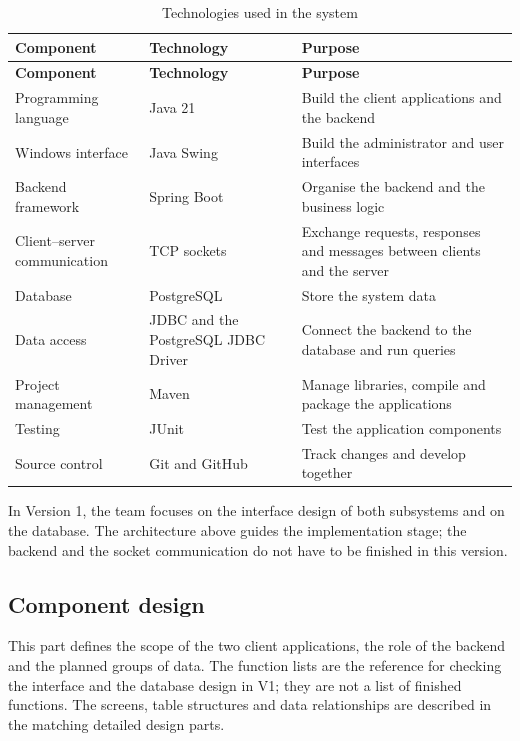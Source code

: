 \begingroup
\small
\begin{longtable}{|L{3.1cm}|L{3.9cm}|L{\dimexpr\textwidth-7cm-6\arrayrulewidth\relax}|}
  \caption{Technologies used in the system}
  \label{tab:technologies}\\
  \hline
  \textbf{Component} & \textbf{Technology} & \textbf{Purpose}\\
  \hline
  \endfirsthead
  \hline
  \textbf{Component} & \textbf{Technology} & \textbf{Purpose}\\
  \hline
  \endhead
  Programming language & Java 21~\cite{ref:java21} & Build the client applications and the backend\\
  \hline
  Windows interface & Java Swing & Build the administrator and user interfaces\\
  \hline
  Backend framework & Spring Boot~\cite{ref:spring-boot} & Organise the backend and the business logic\\
  \hline
  Client--server communication & TCP sockets &
  Exchange requests, responses and messages between clients and the server\\
  \hline
  Database & PostgreSQL~\cite{ref:postgresql} & Store the system data\\
  \hline
  Data access & JDBC and the PostgreSQL JDBC Driver~\cite{ref:pgjdbc} &
  Connect the backend to the database and run queries\\
  \hline
  Project management & Maven & Manage libraries, compile and package the applications\\
  \hline
  Testing & JUnit & Test the application components\\
  \hline
  Source control & Git and GitHub & Track changes and develop together\\
  \hline
\end{longtable}
\endgroup

In Version 1, the team focuses on the interface design of both subsystems and on
the database. The architecture above guides the implementation stage; the backend
and the socket communication do not have to be finished in this version.

\clearpage
\subsection{Component design}
\label{subsec:component-design}

This part defines the scope of the two client applications, the role of the
backend and the planned groups of data. The function lists are the reference for
checking the interface and the database design in V1; they are not a list of
finished functions. The screens, table structures and data relationships are
described in the matching detailed design parts.



\clearpage


\clearpage


\clearpage

